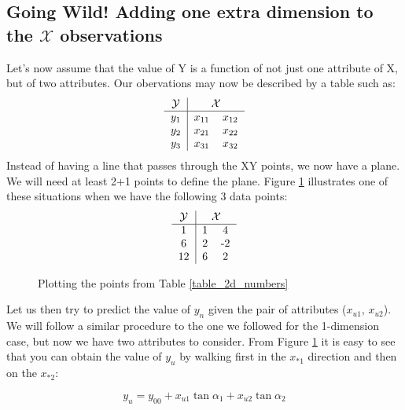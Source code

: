 \subsection{Going Wild! Adding one extra dimension to the $\mathcal{X}$ observations}

Let's now assume that the value of Y is a function of not just one attribute of X, but of two attributes. Our obervations may now be described by a table such as:
\begin{align}
\begin{tabular}{c|cc}
$\mathcal{Y}$ & \multicolumn{2}{c}{$\mathcal{X}$} \\
\hline
$y_1$ & $x_{11}$ & $x_{12}$\\
$y_2$ & $x_{21}$ & $x_{22}$\\
$y_3$ & $x_{31}$ & $x_{32}$\\
\end{tabular}
\label{table_2d_abstract}
\end{align}
Instead of having a line that passes through the XY points, we now have a plane. We will need at least 2+1 points to define the plane. Figure \ref{fig.simple_plane} illustrates one of these situations when we have the following 3 data points:
\begin{align}
\begin{tabular}{c|cc}
$\mathcal{Y}$ & \multicolumn{2}{c}{$\mathcal{X}$} \\
\hline
1 & 1 & 4\\
6 & 2 &-2\\
12&6 & 2\\
\end{tabular}
\label{table_2d_numbers}
\end{align}
\begin {figure}[H]
\begin{center}
  
\end{center}
\caption{Plotting the points from Table \ref{table_2d_numbers}}
\label{fig.simple_plane}
\end {figure}

Let us then try to predict the value of $y_n$ given the pair of attributes ($x_{u1}$, $x_{u2}$). We will follow a similar procedure to the one we followed for the 1-dimension case, but now we have two attributes to consider. From Figure \ref{fig.simple_plane} it is easy to see that you can obtain the value of $y_u$ by walking first in the $x_{*1}$  direction and then on the $x_{*2}$:

\begin{equation}
y_u= y_{00} +  x_{u1} \tan\alpha_1 + x_{u2} \tan\alpha_2
\label{eq.linear_combinations_of_inputs_vectors_2}
\end{equation}

